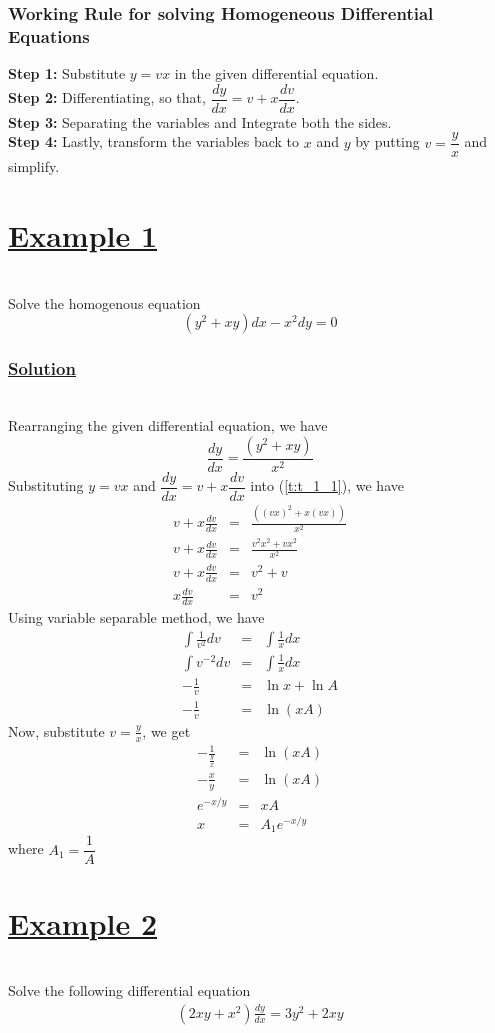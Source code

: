 \documentclass[11pt]{report}
\newcommand{\ubt}[1]{\textbf{\underline{#1}}}
\newcommand{\sps}{\\[0.2cm]}
\newcommand{\spn}[1]{\\[#1cm]}
\newcommand{\refn}[1]{(\ref{#1})}
\newcommand{\bt}[1]{\textbf{#1}}
\newcommand{\example}[1]{\section*{\ubt{Example #1}}{~}\spn{-1}}
\newcommand{\solution}{\subsubsection{\ubt{Solution}}{~}\spn{-1}}
\begin{document}
	\subsubsection*{Working Rule for solving Homogeneous Differential Equations}
	\bt{Step 1:} Substitute  $y = vx$ in the given differential equation.\sps
	\bt{Step 2:} Differentiating, so that, $\dfrac{dy}{dx} = v + x\dfrac{dv}{dx}$.\sps
	\bt{Step 3:} Separating the variables and Integrate both the sides.\sps
	\bt{Step 4: } Lastly, transform the variables back to $x$ and $y$ by putting $v = \dfrac{y}{x}$ and simplify.
	
	\example{1}
	Solve the homogenous equation
	\begin{equation*}
		(y^2 + xy)dx - x^2dy = 0
	\end{equation*}
	
	\solution
	Rearranging the given differential equation, we have
	\begin{equation}
		\frac{dy}{dx} = \frac{(y^2 + xy)}{x^2}\tag{1}\label{t:t_1_1}
	\end{equation}
	Substituting $y=vx$ and $\dfrac{dy}{dx} = v + x\dfrac{dv}{dx}$ into \refn{t:t_1_1}, we have
	\begin{eqnarray*}
		v + x\frac{dv}{dx} &=& \frac{\left((vx)^2 + x(vx)\right)}{x^2}\sps
		v + x\frac{dv}{dx} &=& \frac{v^2x^2 + vx^2}{x^2}\sps
		v + x\frac{dv}{dx} &=& v^2 + v\sps
		x\frac{dv}{dx} &=& v^2
	\end{eqnarray*}
	Using variable separable method, we have
	\begin{eqnarray*}
		\int\frac{1}{v^2}dv &=& \int\frac{1}{x}dx\sps
		\int v^{-2}dv &=& \int \frac{1}{x}dx\sps
		-\frac{1}{v} &=&\ln x + \ln A\sps
		-\frac{1}{v} &=& \ln(xA)
	\end{eqnarray*}
	Now, substitute $v=\frac{y}{x}$, we get
	\begin{eqnarray*}
		-\frac{1}{\frac{y}{x}} &=& \ln(xA)\sps
		-\frac{x}{y} &=& \ln(xA)\sps
		e^{-x/y} &=& xA\sps
		x &=& A_1e^{-x/y}
	\end{eqnarray*}
	where $A_1 = \dfrac{1}{A}$
	
	\example{2}
	Solve the following differential equation
	\begin{eqnarray*}
		(2xy + x^2)\frac{dy}{dx} = 3y^2 + 2xy
	\end{eqnarray*}
	
\end{document}
